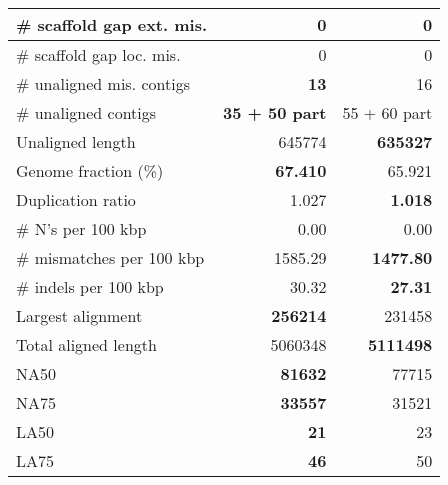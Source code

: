 \documentclass[12pt,a4paper]{article}
\begin{document}
\begin{table}[ht]
\begin{center}
\begin{tabular}{|l*{2}{|r}|}
\# scaffold gap ext. mis. & 0 & 0 \\ \hline
\# scaffold gap loc. mis. & 0 & 0 \\ \hline
\# unaligned mis. contigs & {\bf 13} & 16 \\ \hline
\# unaligned contigs & {\bf 35 + 50 part} & 55 + 60 part \\ \hline
Unaligned length & 645774 & {\bf 635327} \\ \hline
Genome fraction (\%) & {\bf 67.410} & 65.921 \\ \hline
Duplication ratio & 1.027 & {\bf 1.018} \\ \hline
\# N's per 100 kbp & 0.00 & 0.00 \\ \hline
\# mismatches per 100 kbp & 1585.29 & {\bf 1477.80} \\ \hline
\# indels per 100 kbp & 30.32 & {\bf 27.31} \\ \hline
Largest alignment & {\bf 256214} & 231458 \\ \hline
Total aligned length & 5060348 & {\bf 5111498} \\ \hline
NA50 & {\bf 81632} & 77715 \\ \hline
NA75 & {\bf 33557} & 31521 \\ \hline
LA50 & {\bf 21} & 23 \\ \hline
LA75 & {\bf 46} & 50 \\ \hline
\end{tabular}
\end{center}
\end{table}
\end{document}
